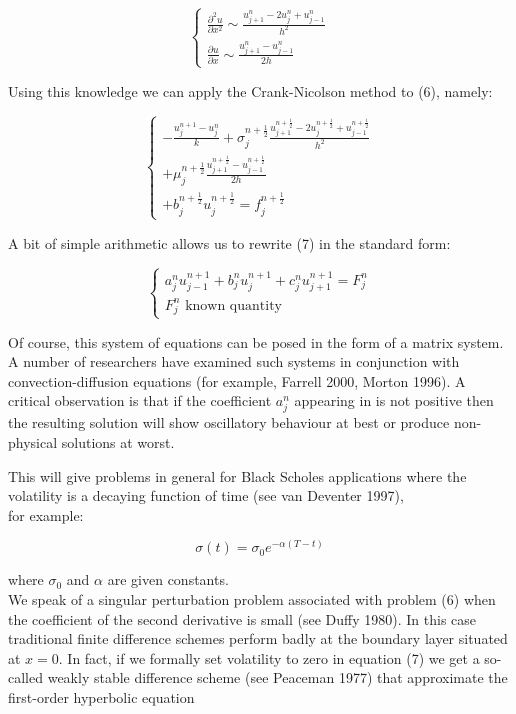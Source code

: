 \documentclass[10pt]{article}
\begin{document}
$$
\left\{\begin{array}{l}
\frac{\partial^{2} u}{\partial x^{2}} \sim \frac{u_{j+1}^{n}-2 u_{j}^{n}+u_{j-1}^{n}}{h^{2}} \\
\frac{\partial u}{\partial x} \sim \frac{u_{j+1}^{n}-u_{j-1}^{n}}{2 h}
\end{array}\right.
$$

Using this knowledge we can apply the Crank-Nicolson method to (6), namely:

\[
\left\{\begin{array}{l}
-\frac{u_{j}^{n+1}-u_{j}^{n}}{k}+\sigma_{j}^{n+\frac{1}{2}} \frac{u_{j+1}^{n+\frac{1}{2}}-2 u_{j}^{n+\frac{1}{2}}+u_{j-1}^{n+\frac{1}{2}}}{h^{2}}  \tag{7}\\
+\mu_{j}^{n+\frac{1}{2}} \frac{u_{j+1}^{n+\frac{1}{2}}-u_{j-1}^{n+\frac{1}{2}}}{2 h} \\
+b_{j}^{n+\frac{1}{2}} u_{j}^{n+\frac{1}{2}}=f_{j}^{n+\frac{1}{2}}
\end{array}\right.
\]

A bit of simple arithmetic allows us to rewrite (7) in the standard form:

\[
\left\{\begin{array}{l}
a_{j}^{n} u_{j-1}^{n+1}+b_{j}^{n} u_{j}^{n+1}+c_{j}^{n} u_{j+1}^{n+1}=F_{j}^{n}  \tag{8}\\
F_{j}^{n} \text { known quantity }
\end{array}\right.
\]

Of course, this system of equations can be posed in the form of a matrix system. A number of researchers have examined such systems in conjunction with convection-diffusion equations (for example, Farrell 2000, Morton 1996). A critical observation is that if the coefficient $a_{j}^{n}$ appearing in is not positive then the resulting solution will show oscillatory behaviour at best or produce non-physical solutions at worst.

This will give problems in general for Black Scholes applications where the volatility is a decaying function of time (see van Deventer 1997),\\
for example:

$$
\sigma(t)=\sigma_{0} e^{-\alpha(T-t)}
$$

where $\sigma_{0}$ and $\alpha$ are given constants.\\
We speak of a singular perturbation problem associated with problem (6) when the coefficient of the second derivative is small (see Duffy 1980). In this case traditional finite difference schemes perform badly at the boundary layer situated at $x=0$. In fact, if we formally set volatility to zero in equation (7) we get a so-called weakly stable difference scheme (see Peaceman 1977) that approximate the first-order hyperbolic equation
\end{document}

